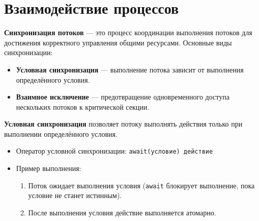\documentclass[a4paper, 12pt]{report}
\numberwithin{equation}{section}
\begin{document}
\section{Взаимодействие процессов}
\textbf{Синхронизация потоков} — это процесс координации выполнения потоков для достижения корректного управления общими ресурсами. Основные виды синхронизации:
\begin{itemize}
    \item \textbf{Условная синхронизация} — выполнение потока зависит от выполнения определённого условия.
    \item \textbf{Взаимное исключение} — предотвращение одновременного доступа нескольких потоков к критической секции.
\end{itemize}
\textbf{Условная синхронизация} позволяет потоку выполнять действия только при выполнении определённого условия. 
\begin{itemize}
    \item Оператор условной синхронизации: \texttt{await(условие) действие}
    \item Пример выполнения:
    \begin{enumerate}
        \item Поток ожидает выполнения условия (\texttt{await} блокирует выполнение, пока условие не станет истинным).
        \item После выполнения условия действие выполняется атомарно.
    \end{enumerate}
\end{itemize}
\end{document}
